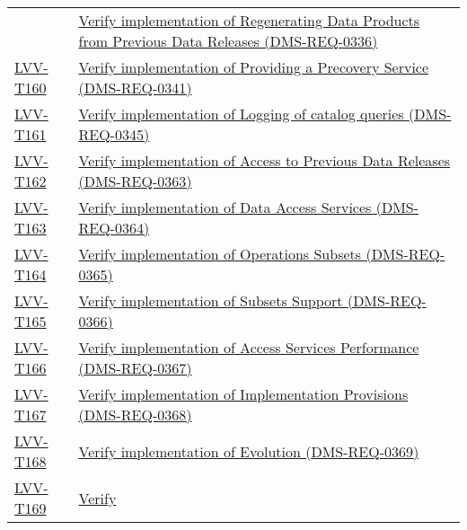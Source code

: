 \begin{longtable}[]{p{3cm}p{13cm}}
&
\href{https://jira.lsstcorp.org/secure/Tests.jspa\#/testCase/LVV-T159}{Verify
implementation of Regenerating Data Products from Previous Data Releases
(DMS-REQ-0336)}\tabularnewline
\protect\hyperlink{lvv-t160---verify-implementation-of-providing-a-precovery-service-dms-req-0341}{LVV-T160}
&
\href{https://jira.lsstcorp.org/secure/Tests.jspa\#/testCase/LVV-T160}{Verify
implementation of Providing a Precovery Service
(DMS-REQ-0341)}\tabularnewline
\protect\hyperlink{lvv-t161---verify-implementation-of-logging-of-catalog-queries-dms-req-0345}{LVV-T161}
&
\href{https://jira.lsstcorp.org/secure/Tests.jspa\#/testCase/LVV-T161}{Verify
implementation of Logging of catalog queries
(DMS-REQ-0345)}\tabularnewline
\protect\hyperlink{lvv-t162---verify-implementation-of-access-to-previous-data-releases-dms-req-0363}{LVV-T162}
&
\href{https://jira.lsstcorp.org/secure/Tests.jspa\#/testCase/LVV-T162}{Verify
implementation of Access to Previous Data Releases
(DMS-REQ-0363)}\tabularnewline
\protect\hyperlink{lvv-t163---verify-implementation-of-data-access-services-dms-req-0364}{LVV-T163}
&
\href{https://jira.lsstcorp.org/secure/Tests.jspa\#/testCase/LVV-T163}{Verify
implementation of Data Access Services (DMS-REQ-0364)}\tabularnewline
\protect\hyperlink{lvv-t164---verify-implementation-of-operations-subsets-dms-req-0365}{LVV-T164}
&
\href{https://jira.lsstcorp.org/secure/Tests.jspa\#/testCase/LVV-T164}{Verify
implementation of Operations Subsets (DMS-REQ-0365)}\tabularnewline
\protect\hyperlink{lvv-t165---verify-implementation-of-subsets-support-dms-req-0366}{LVV-T165}
&
\href{https://jira.lsstcorp.org/secure/Tests.jspa\#/testCase/LVV-T165}{Verify
implementation of Subsets Support (DMS-REQ-0366)}\tabularnewline
\protect\hyperlink{lvv-t166---verify-implementation-of-access-services-performance-dms-req-0367}{LVV-T166}
&
\href{https://jira.lsstcorp.org/secure/Tests.jspa\#/testCase/LVV-T166}{Verify
implementation of Access Services Performance
(DMS-REQ-0367)}\tabularnewline
\protect\hyperlink{lvv-t167---verify-implementation-of-implementation-provisions-dms-req-0368}{LVV-T167}
&
\href{https://jira.lsstcorp.org/secure/Tests.jspa\#/testCase/LVV-T167}{Verify
implementation of Implementation Provisions
(DMS-REQ-0368)}\tabularnewline
\protect\hyperlink{lvv-t168---verify-implementation-of-evolution-dms-req-0369}{LVV-T168}
&
\href{https://jira.lsstcorp.org/secure/Tests.jspa\#/testCase/LVV-T168}{Verify
implementation of Evolution (DMS-REQ-0369)}\tabularnewline
\protect\hyperlink{lvv-t169---verify-implementation-of-older-release-behavior-dms-req-0370}{LVV-T169}
&
\href{https://jira.lsstcorp.org/secure/Tests.jspa\#/testCase/LVV-T169}{Verify
}
\end{longtable}
